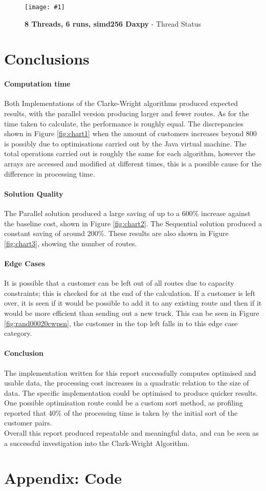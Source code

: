 \documentclass[conference]{acmsiggraph}
\newcommand{\figuremacroF}[4]{
	\begin{figure*}[t] %
		\centering
		\texttt{[image: \#1]}
		\caption[#2]{\textbf{#2} - #3}
		\label{fig:#1}
	\end{figure*}
}
\begin{document}
\figuremacroF
{t8i8simd256conp}
{8 Threads, 6 runs, simd256 Daxpy}
{Thread Status}
{1.0}


\section{Conclusions}
\paragraph{Computation time}
Both Implementations of the Clarke-Wright algorithms produced expected results, with the parallel version producing larger and fewer routes. As for the time taken to calculate, the performance is roughly equal.
The discrepancies shown in Figure \ref{fig:chart1} when the amount of customers increases beyond 800 is possibly due to optimisations carried out by the Java virtual machine. The total operations carried out is roughly the same for each algorithm, however the arrays are accessed and modified at different times, this is a possible cause for the difference in processing time.

\paragraph{Solution Quality}
The Parallel solution produced a large saving of up to a 600\% increase against the baseline cost, shown in Figure \ref{fig:chart2}. The Sequential solution produced a constant saving of around 200\%. These results are also shown in Figure \ref{fig:chart3}, showing the number of routes.

\paragraph{Edge Cases}
It is possible that a customer can be left out of all routes due to capacity constraints; this is checked for at the end of the calculation. If a customer is left over, it is seen if it would be possible to add it to any existing route and then if it would be more efficient than sending out a new truck. This can be seen in Figure \ref{fig:rand00020cwpsn}, the customer in the top left falls in to this edge case category.

\paragraph{Conclusion}
The implementation written for this report successfully computes optimised and usable data, the processing cost increases in a quadratic relation to the size of data. The specific implementation could be optimised to produce quicker results. One possible optimisation route could be a custom sort method, as profiling reported that 40\% of the processing time is taken by the initial sort of the customer pairs.\\
Overall this report produced repeatable and meaningful data, and can be seen as a successful investigation into the Clark-Wright Algorithm.


\clearpage

\section{Appendix: Code}

\end{document}
